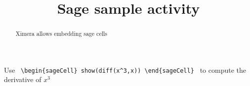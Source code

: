 \documentclass[handout]{ximera}
\title{Sage sample activity}
\begin{document}
\begin{abstract} Ximera allows embedding sage cells
\end{abstract}


\maketitle

Use \verb! \begin{sageCell} show(diff(x^3,x)) \end{sageCell} ! to compute the derivative of \( x^3 \)

\end{document}

